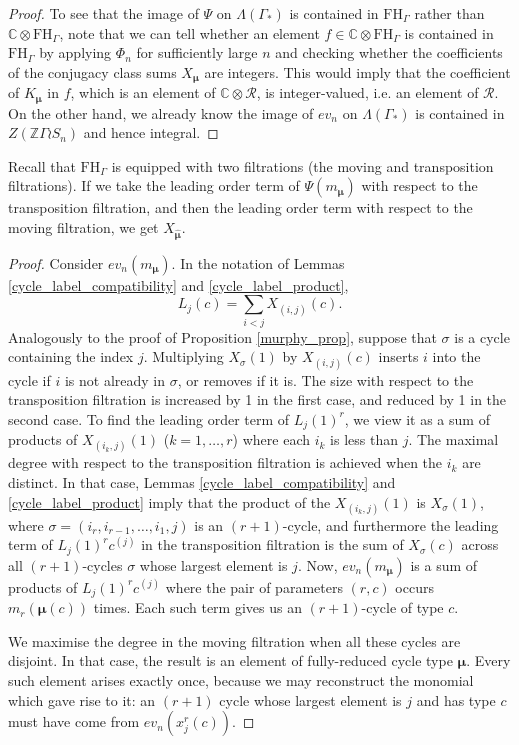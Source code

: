\documentclass[ALCO,Unicode]{cedram}
\newcommand{\bs}{\boldsymbol}
\newcommand{\LambdaG}{\Lambda(\Gamma_*)}
\newcommand{\FHG}{\mathrm{FH}_{\Gamma}}
\newcommand{\LambdaG}{\Lambda(\Gamma_*)}
\newcommand{\FHG}{\mathrm{FH}_{\Gamma}}
\begin{document}
\begin{proof}
To see that the image of $\Psi$ on $\LambdaG$ is contained in $\FHG$ rather than $\mathbb{C}\otimes \FHG$, note that we can tell whether an element $f \in \mathbb{C} \otimes \FHG$ is contained in $\FHG$ by applying $\Phi_n$ for sufficiently large $n$ and checking whether the coefficients of the conjugacy class sums $X_{\bs\mu}$ are integers. This would imply that the coefficient of $K_{\bs\mu}$ in $f$, which is an element of $\mathbb{C} \otimes \mathcal{R}$, is integer-valued, i.e. an element of $\mathcal{R}$. On the other hand, we already know the image of $ev_n$ on $\LambdaG$ is contained in $Z(\mathbb{Z}\Gamma \wr S_n)$ and hence integral.

\end{proof}


\begin{proposition}
Recall that $\FHG$ is equipped with two filtrations \textup{(}the moving and transposition filtrations\textup{)}. If we take the leading order term of $\Psi(m_{\bs\mu})$ with respect to the transposition filtration, and then the leading order term with respect to the  moving filtration, we get $X_{\bm\hat{\bs\mu}}$.
\end{proposition}

\begin{proof}
Consider $ev_n(m_{\bs\mu})$. In the notation of Lemmas \ref{cycle_label_compatibility} and \ref{cycle_label_product},
\[
L_j(c) = \sum_{i<j} X_{(i,j)}(c).
\]
Analogously to the proof of Proposition \ref{murphy_prop}, suppose that $\sigma$ is a cycle containing the index $j$. Multiplying $X_{\sigma}(1)$ by $X_{(i,j)}(c)$ inserts $i$ into the cycle if $i$ is not already in $\sigma$, or removes if it is. The size with respect to the transposition filtration is increased by 1 in the first case, and reduced by 1 in the second case. To find the leading order term of $L_j(1)^r$, we view it as a sum of products of $X_{(i_k,j)}(1)$ ($k=1,\ldots,r$) where each $i_k$ is less than $j$. The maximal degree with respect to the transposition filtration is achieved when the $i_k$ are distinct. In that case, Lemmas \ref{cycle_label_compatibility} and \ref{cycle_label_product} imply that the product of the $X_{(i_k,j)}(1)$ is $X_{\sigma}(1)$, where $\sigma = (i_r, i_{r-1}, \ldots, i_1, j)$ is an $(r+1)$-cycle, and furthermore the leading term of $L_j(1)^r c^{(j)}$ in the transposition filtration is the sum of $X_{\sigma}(c)$ across all $(r+1)$-cycles $\sigma$ whose largest element is $j$. Now, $ev_n(m_{\bs\mu})$ is a sum of products of $L_j(1)^r c^{(j)}$ where the pair of parameters $(r, c)$ occurs $m_r(\bs\mu(c))$ times. Each such term gives us an $(r+1)$-cycle of type $c$.

We maximise the degree in the moving filtration when all these cycles are disjoint. In that case, the result is an element of fully-reduced cycle type $\bs\mu$. Every such element arises exactly once, because we may reconstruct the monomial which gave rise to it: an $(r+1)$ cycle whose largest element is $j$ and has type $c$ must have come from $ev_n(x_j^r(c))$.
\end{proof}
\end{document}
